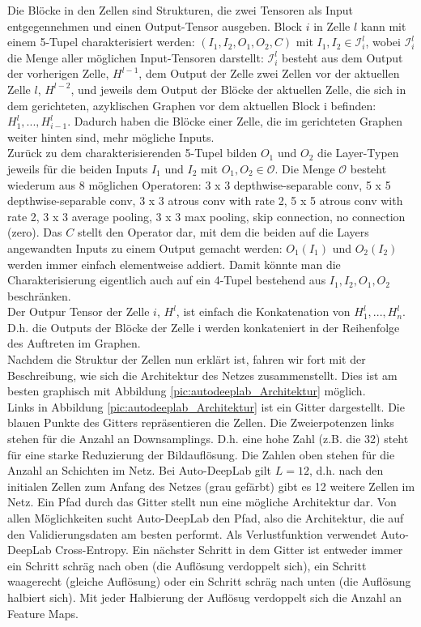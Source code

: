 Die Blöcke in den Zellen sind Strukturen, die zwei Tensoren als Input entgegennehmen und einen Output-Tensor ausgeben. Block $i$ in Zelle $l$ kann mit einem 5-Tupel charakterisiert werden: $(I_1, I_2, O_1, O_2, C)$ mit $I_1, I_2 \in \mathcal{I}_{i}^{l}$, wobei $\mathcal{I}_{i}^{l}$ die Menge aller möglichen Input-Tensoren darstellt: $\mathcal{I}_{i}^{l}$ besteht aus dem Output der vorherigen Zelle, $H^{l-1}$, dem Output der Zelle zwei Zellen vor der aktuellen Zelle $l$, $H^{l-2}$, und jeweils dem Output der Blöcke der aktuellen Zelle, die sich in dem gerichteten, azyklischen Graphen vor dem aktuellen Block i befinden: $H_{1}^{l}, ... , H_{i-1}^{l}$. Dadurch haben die Blöcke einer Zelle, die im gerichteten Graphen weiter hinten sind, mehr mögliche Inputs.\\
Zurück zu dem charakterisierenden 5-Tupel bilden $O_1$ und $O_2$ die Layer-Typen jeweils für die beiden Inputs $I_1$ und $I_2$ mit $O_1, O_2 \in \mathcal{O}$. Die Menge $\mathcal{O}$ besteht wiederum aus 8 möglichen Operatoren: 3 x 3 depthwise-separable conv, 5 x 5 depthwise-separable conv, 3 x 3 atrous conv with rate 2, 5 x 5 atrous conv with rate 2, 3 x 3 average pooling, 3 x 3 max pooling, skip connection, no connection (zero). Das $C$ stellt den Operator dar, mit dem die beiden auf die Layers angewandten Inputs zu einem Output gemacht werden: $O_{1}(I_{1})$ und $O_{2}(I_{2})$ werden immer einfach elementweise addiert. Damit könnte man die Charakterisierung eigentlich auch auf ein 4-Tupel bestehend aus $I_1, I_2, O_1, O_2$ beschränken.\\
Der Outpur Tensor der Zelle $i$, $H^l$, ist einfach die Konkatenation von $H_{1}^{l}, ..., H_{n}^{l}$. D.h. die Outputs der Blöcke der Zelle i werden konkateniert in der Reihenfolge des Auftreten im Graphen.\\[0.3cm]
Nachdem die Struktur der Zellen nun erklärt ist, fahren wir fort mit der Beschreibung, wie sich die Architektur des Netzes zusammenstellt. Dies ist am besten graphisch mit Abbildung \ref{pic:autodeeplab_Architektur} möglich.\\
Links in Abbildung \ref{pic:autodeeplab_Architektur} ist ein Gitter dargestellt. Die blauen Punkte des Gitters repräsentieren die Zellen. Die Zweierpotenzen links stehen für die Anzahl an Downsamplings. D.h. eine hohe Zahl (z.B. die 32) steht für eine starke Reduzierung der Bildauflösung. Die Zahlen oben stehen für die Anzahl an Schichten im Netz. Bei Auto-DeepLab gilt $L=12$, d.h. nach den initialen Zellen zum Anfang des Netzes (grau gefärbt) gibt es 12 weitere Zellen im Netz. Ein Pfad durch das Gitter stellt nun eine mögliche Architektur dar. Von allen Möglichkeiten sucht Auto-DeepLab den Pfad, also die Architektur, die auf den Validierungsdaten am besten performt. Als Verlustfunktion verwendet Auto-DeepLab Cross-Entropy. Ein nächster Schritt in dem Gitter ist entweder immer ein Schritt schräg nach oben (die Auflösung verdoppelt sich), ein Schritt waagerecht (gleiche Auflösung) oder ein Schritt schräg nach unten (die Auflösung halbiert sich). Mit jeder Halbierung der Auflösug verdoppelt sich die Anzahl an Feature Maps.\\

